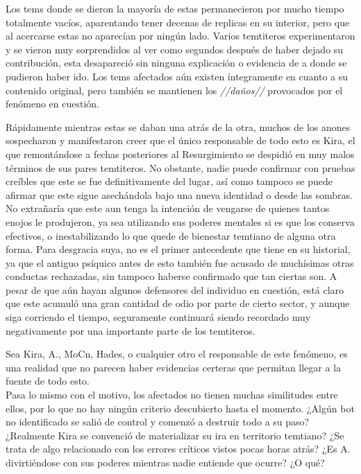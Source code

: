 \documentclass[
  spanish,
]{book}
\begin{document}
Los tems donde se dieron la mayoría de estas permanecieron por mucho tiempo totalmente vacíos, aparentando tener decenas de replicas en su interior, pero que al acercarse estas no aparecían por ningún lado. Varios temtiteros experimentaron y se vieron muy sorprendidos al ver como segundos después de haber dejado su contribución, esta desapareció sin ninguna explicación o evidencia de a donde se pudieron haber ido. Los tems afectados aún existen íntegramente en cuanto a su contenido original, pero también se mantienen los \emph{//daños//} provocados por el fenómeno en cuestión.

Rápidamente mientras estas se daban una atrás de la otra, muchos de los anones sospecharon y manifestaron creer que el único responsable de todo esto es Kira, el que remontándose a fechas posteriores al Resurgimiento se despidió en muy malos términos de sus pares temtiteros. No obstante, nadie puede confirmar con pruebas creíbles que este se fue definitivamente del lugar, así como tampoco se puede afirmar que este sigue asechándola bajo una nueva identidad o desde las sombras.\\
No extrañaría que este aun tenga la intención de vengarse de quienes tantos enojos le produjeron, ya sea utilizando sus poderes mentales si es que los conserva efectivos, o inestabilizando lo que quede de bienestar temtiano de alguna otra forma. Para desgracia suya, no es el primer antecedente que tiene en su historial, ya que el antiguo psíquico antes de esto también fue acusado de muchísimas otras conductas rechazadas, sin tampoco haberse confirmado que tan ciertas son. A pesar de que aún hayan algunos defensores del individuo en cuestión, está claro que este acumuló una gran cantidad de odio por parte de cierto sector, y aunque siga corriendo el tiempo, seguramente continuará siendo recordado muy negativamente por una importante parte de los temtiteros.

Sea Kira, A., MoCn, Hades, o cualquier otro el responsable de este fenómeno, es una realidad que no parecen haber evidencias certeras que permitan llegar a la fuente de todo esto.\\
Pasa lo mismo con el motivo, los afectados no tienen muchas similitudes entre ellos, por lo que no hay ningún criterio descubierto hasta el momento. ¿Algún bot no identificado se salió de control y comenzó a destruir todo a su paso? ¿Realmente Kira se convenció de materializar su ira en territorio temtiano? ¿Se trata de algo relacionado con los errores críticos vistos pocas horas atrás? ¿Es A. divirtiéndose con sus poderes mientras nadie entiende que ocurre? ¿O qué?
\end{document}
